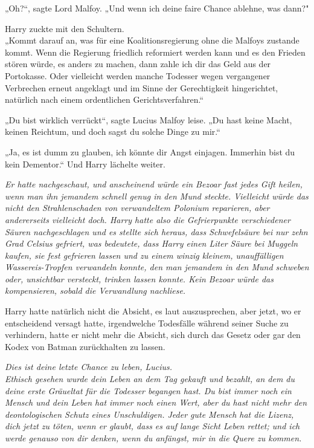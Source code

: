 {„Oh?“, sagte Lord Malfoy. „Und wenn ich deine faire Chance ablehne, was dann?"

Harry zuckte mit den Schultern.\\ „Kommt darauf an, was für eine Koalitionsregierung ohne die Malfoys zustande kommt. Wenn die Regierung friedlich reformiert werden kann und es den Frieden stören würde, es anders zu machen, dann zahle ich dir das Geld aus der Portokasse. Oder vielleicht werden manche Todesser wegen vergangener Verbrechen erneut angeklagt und im Sinne der Gerechtigkeit hingerichtet, natürlich nach einem ordentlichen Gerichtsverfahren.“

„Du bist wirklich verrückt“, sagte Lucius Malfoy leise. „Du hast keine Macht, keinen Reichtum, und doch sagst du solche Dinge zu mir.“

„Ja, es ist dumm zu glauben, ich könnte dir Angst einjagen. Immerhin bist du kein Dementor.“ Und Harry lächelte weiter.

\emph{Er hatte nachgeschaut, und anscheinend würde ein Bezoar fast jedes Gift heilen, wenn man ihn jemandem schnell genug in den Mund steckte. Vielleicht würde das nicht den Strahlenschaden von verwandeltem Polonium reparieren, aber andererseits vielleicht doch. Harry hatte also die Gefrierpunkte verschiedener Säuren nachgeschlagen und es stellte sich heraus, dass Schwefelsäure bei nur zehn Grad Celsius gefriert, was bedeutete, dass Harry einen Liter Säure bei Muggeln kaufen, sie fest gefrieren lassen und zu einem winzig kleinem, unauffälligen Wassereis-Tropfen verwandeln konnte, den man jemandem in den Mund schweben oder, unsichtbar versteckt, trinken lassen konnte. Kein Bezoar würde das kompensieren, sobald die Verwandlung nachliese.}

Harry hatte natürlich nicht die Absicht, es laut auszusprechen, aber jetzt, wo er entscheidend versagt hatte, irgendwelche Todesfälle während seiner Suche zu verhindern, hatte er nicht mehr die Absicht, sich durch das Gesetz oder gar den Kodex von Batman zurückhalten zu lassen.

\emph{Dies ist deine letzte Chance zu leben, Lucius.}\\ \emph{Ethisch gesehen wurde dein Leben an dem Tag gekauft und bezahlt, an dem du deine erste Gräueltat für die Todesser begangen hast. Du bist immer noch ein Mensch und dein Leben hat immer noch einen Wert, aber du hast nicht mehr den deontologischen Schutz eines Unschuldigen. Jeder gute Mensch hat die Lizenz, dich jetzt zu töten, wenn er glaubt, dass es auf lange Sicht Leben rettet; und ich werde genauso von dir denken, wenn du anfängst, mir in die Quere zu kommen.}

}
